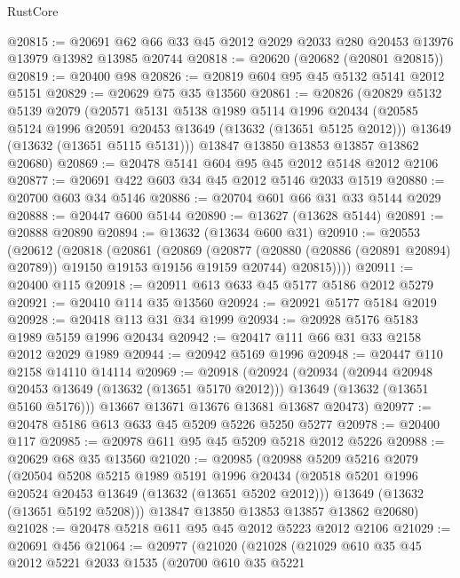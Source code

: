 \begin{lexlean}{RustCore}
\begin{coremodule}
@20815 := @20691 @62 @66 @33 @45 @2012 @2029 @2033 @280 @20453 @13976 @13979 @13982 @13985 @20744
@20818 := @20620 (@20682 (@20801 @20815))
@20819 := @20400 @98
@20826 := @20819 @604 @95 @45 @5132 @5141 @2012 @5151
@20829 := @20629 @75 @35 @13560
@20861 := @20826
    (@20829
      @5132
      @5139
      @2079
      (@20571
        @5131
        @5138
        @1989
        @5114
        @1996
        @20434
        (@20585 @5124 @1996 @20591 @20453 @13649 (@13632 (@13651 @5125 @2012)))
        @13649
        (@13632 (@13651 @5115 @5131)))
      @13847
      @13850
      @13853
      @13857
      @13862
      @20680)
@20869 := @20478 @5141 @604 @95 @45 @2012 @5148 @2012 @2106
@20877 := @20691 @422 @603 @34 @45 @2012 @5146 @2033 @1519
@20880 := @20700 @603 @34 @5146
@20886 := @20704 @601 @66 @31 @33 @5144 @2029
@20888 := @20447 @600 @5144
@20890 := @13627 (@13628 @5144)
@20891 := @20888 @20890
@20894 := @13632 (@13634 @600 @31)
@20910 := @20553
    (@20612
      (@20818
        (@20861
          (@20869
            (@20877 (@20880 (@20886 (@20891 @20894) @20789)) @19150 @19153 @19156 @19159 @20744)
            @20815))))
@20911 := @20400 @115
@20918 := @20911 @613 @633 @45 @5177 @5186 @2012 @5279
@20921 := @20410 @114 @35 @13560
@20924 := @20921 @5177 @5184 @2019
@20928 := @20418 @113 @31 @34 @1999
@20934 := @20928 @5176 @5183 @1989 @5159 @1996 @20434
@20942 := @20417 @111 @66 @31 @33 @2158 @2012 @2029 @1989
@20944 := @20942 @5169 @1996
@20948 := @20447 @110 @2158 @14110 @14114
@20969 := @20918
    (@20924
      (@20934
        (@20944 @20948 @20453 @13649 (@13632 (@13651 @5170 @2012)))
        @13649
        (@13632 (@13651 @5160 @5176)))
      @13667
      @13671
      @13676
      @13681
      @13687
      @20473)
@20977 := @20478 @5186 @613 @633 @45 @5209 @5226 @5250 @5277
@20978 := @20400 @117
@20985 := @20978 @611 @95 @45 @5209 @5218 @2012 @5226
@20988 := @20629 @68 @35 @13560
@21020 := @20985
    (@20988
      @5209
      @5216
      @2079
      (@20504
        @5208
        @5215
        @1989
        @5191
        @1996
        @20434
        (@20518 @5201 @1996 @20524 @20453 @13649 (@13632 (@13651 @5202 @2012)))
        @13649
        (@13632 (@13651 @5192 @5208)))
      @13847
      @13850
      @13853
      @13857
      @13862
      @20680)
@21028 := @20478 @5218 @611 @95 @45 @2012 @5223 @2012 @2106
@21029 := @20691 @456
@21064 := @20977
    (@21020
      (@21028
        (@21029
          @610
          @35
          @45
          @2012
          @5221
          @2033
          @1535
          (@20700
            @610
            @35
            @5221

\end{coremodule}
\end{lexlean}
